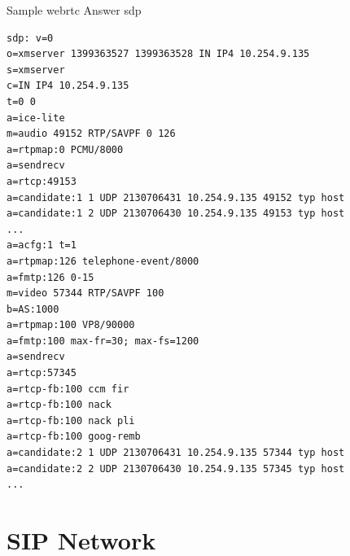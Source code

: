 \begin{algorithm}[h]
  \caption{Sample \gls{webrtc} Answer \gls{sdp}}
  \label{log:webrtc_answer_sdp}
  \begin{verbatim}
sdp: v=0
o=xmserver 1399363527 1399363528 IN IP4 10.254.9.135
s=xmserver
c=IN IP4 10.254.9.135
t=0 0
a=ice-lite
m=audio 49152 RTP/SAVPF 0 126
a=rtpmap:0 PCMU/8000
a=sendrecv
a=rtcp:49153
a=candidate:1 1 UDP 2130706431 10.254.9.135 49152 typ host
a=candidate:1 2 UDP 2130706430 10.254.9.135 49153 typ host
...
a=acfg:1 t=1
a=rtpmap:126 telephone-event/8000
a=fmtp:126 0-15
m=video 57344 RTP/SAVPF 100
b=AS:1000
a=rtpmap:100 VP8/90000
a=fmtp:100 max-fr=30; max-fs=1200
a=sendrecv
a=rtcp:57345
a=rtcp-fb:100 ccm fir
a=rtcp-fb:100 nack
a=rtcp-fb:100 nack pli
a=rtcp-fb:100 goog-remb
a=candidate:2 1 UDP 2130706431 10.254.9.135 57344 typ host
a=candidate:2 2 UDP 2130706430 10.254.9.135 57345 typ host
...
 \end{verbatim}
\end{algorithm}

\section{SIP Network}